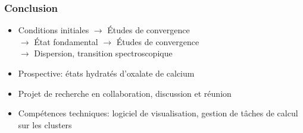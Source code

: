 \documentclass[french]{beamer}
\begin{document}

\begin{frame}
\frametitle{Conclusion}
\begin{itemize}
  \item Conditions initiales $\rightarrow$ Études de convergence\\ $\rightarrow$ État fondamental $\rightarrow$ Études de convergence\\ $\rightarrow$ Dispersion, transition spectroscopique
  \item Prospective: états hydratés d'oxalate de calcium
  \item Projet de recherche en collaboration, discussion et réunion
  \item Compétences techniques: logiciel de visualisation, gestion de tâches de calcul sur les clusters
\end{itemize}

\end{frame}
\end{document}
